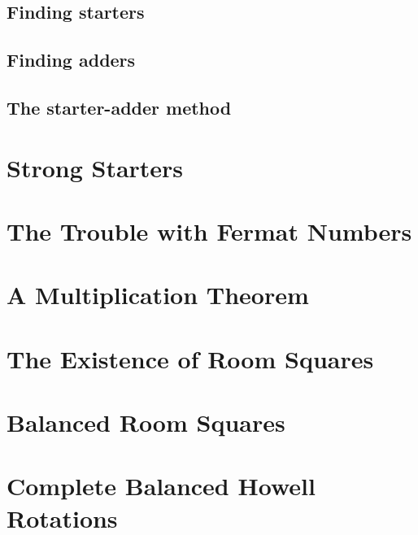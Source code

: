 \documentclass[a4paper, draft]{book}
\begin{document}
  \section{Finding starters}
    
  \section{Finding adders}
    
  \section{The starter-adder method}
    

\chapter{Strong Starters}
  \label{ch:strong-starters}
  
  

\chapter{The Trouble with Fermat Numbers}
  \label{ch:trouble-fermat}
  

\chapter{A Multiplication Theorem}
  \label{ch:multiplication-theorem}
  
  

\chapter{The Existence of Room Squares}
  \label{ch:existence-theorem}
  
  

\chapter{Balanced Room Squares}
  \label{ch:balanced-room-squares}
  

\chapter{Complete Balanced Howell Rotations}
  \label{ch:cbhr}
  
  
\end{document}
